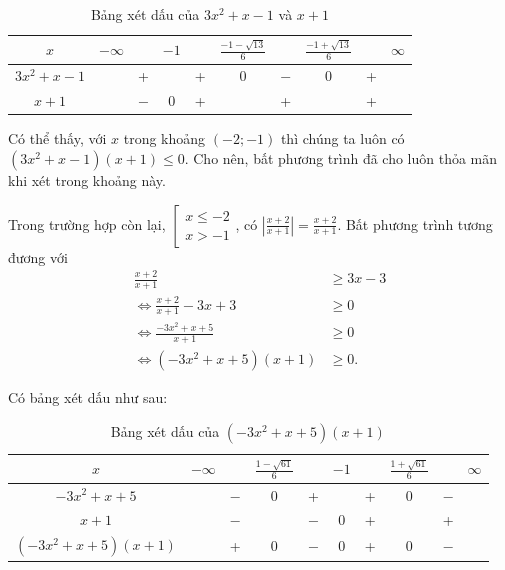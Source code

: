 \begin{table}[H]
   \centering
   \begin{tabular}{|c|ccccccccc|}
   \hline
   $x$                 & $-\infty$ &     & $-1$ &   & $\frac{-1 - \sqrt{13}}{6}$ &     & $\frac{-1+\sqrt{13}}{6}$ &   & $\infty$ \\
   \hline
   $3 x^{2}+x-1$       &           &  +  &      & + &                 0                  & $-$ &                 0                  & + &           \\
   \hline
   $x+1$               &           & $-$ &  0   & + &                                    &  +  &                                    & + &           \\
   \hline

   \end{tabular}
   \caption{Bảng xét dấu của $3x^2 + x - 1$ và $x + 1$}
\end{table}

Có thể thấy, với $x$ trong khoảng $\left(-2; -1\right)$ thì chúng ta luôn có $\left(3x^2 + x - 1\right)(x + 1) \leq 0$. Cho nên, bất phương trình đã cho luôn thỏa mãn khi xét trong khoảng này. 

Trong trường hợp còn lại, $\left[\begin{array}{l}
   x \leq -2 \\
   x > -1
\end{array}\right.$, có $\left| \frac{x + 2}{x + 1} \right| = \frac{x + 2}{x + 1} $. Bất phương trình tương đương với
\begin{align*}
   \frac{x + 2}{x + 1} &\geq 3x - 3 \\
   \iff \frac{x + 2}{x + 1} - 3x + 3 &\geq 0 \\
   \iff \frac{-3x^2 + x + 5}{x + 1} &\geq 0 \\
   \iff \left(-3x^2 + x + 5\right)\left(x + 1\right) &\geq 0.
\end{align*}

Có bảng xét dấu như sau:
\begin{table}[H]
   \centering
   \begin{tabular}{|c|ccccccccc|}
   \hline
   $x$                  & $-\infty$ &     & $\frac{1 - \sqrt{61}}{6}$ &     & $-1$ &   & $\frac{1 + \sqrt{61}}{6}$ &     & $\infty$ \\
   \hline
   $-3 x^{2}+x+5$       &           & $-$ &                 0                  &  +  &      & + &                 0                 & $-$ &           \\
   \hline
   $x+1$                &           & $-$ &                                    & $-$ &  0   & + &                                   &  +  &           \\
   \hline
   $\left(-3x^{2}+x+5\right)(x+1)$ &           &  +  &                 0                  & $-$ &  0   & + &                 0                 & $-$ &           \\
   \hline
   \end{tabular}
   \caption{Bảng xét dấu của $\left(-3x^{2}+x+5\right)(x+1)$}
\end{table}

